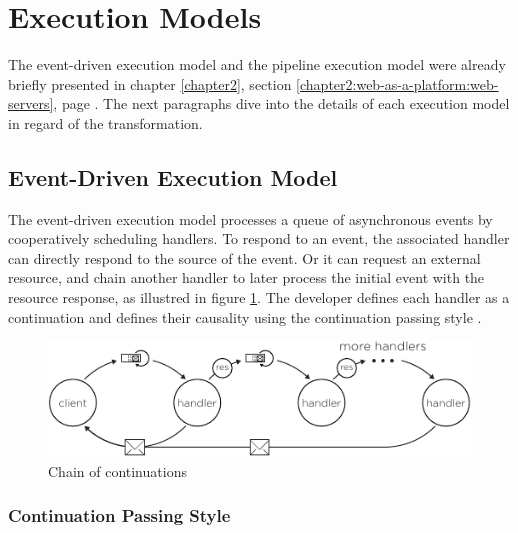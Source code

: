 \section{Execution Models} \label{chapter4:execution-models}

The event-driven execution model and the pipeline execution model were already briefly presented in chapter \ref{chapter2}, section \ref{chapter2:web-as-a-platform:web-servers}, page \pageref{chapter2:web-as-a-platform:web-servers}.
The next paragraphs dive into the details of each execution model in regard of the transformation.

\subsection{Event-Driven Execution Model} \label{chapter4:event-driven}

The event-driven execution model processes a queue of asynchronous events by cooperatively scheduling handlers.
To respond to an event, the associated handler can directly respond to the source of the event.
Or it can request an external resource, and chain another handler to later process the initial event with the resource response, as illustred in figure \ref{fig:cont-chain}.
The developer defines each handler as a continuation and defines their causality using the continuation passing style \cite{Wand1980,Haynes1984}.

\begin{figure}[h!]
  \centering
  \includegraphics[width=0.7\linewidth]{../resources/cont-chain.pdf}
  \caption{Chain of continuations}
  \label{fig:cont-chain}
\end{figure}

\subsubsection{Continuation Passing Style} \label{chapter4:event-loop:continuation}



